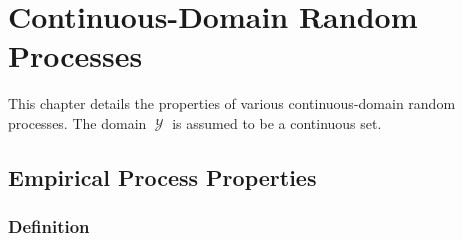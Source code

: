 \documentclass[12pt]{report}
\DeclareMathOperator{\Prm}{\mathrm{P}}
\DeclareMathOperator{\Ycal}{\mathcal{Y}}
\DeclareMathOperator{\Zcal}{\mathcal{Z}}
\DeclareMathOperator{\Mcal}{\mathcal{M}}
\DeclareMathOperator{\Scal}{\mathcal{S}}
\DeclareMathOperator{\Zbbgeq}{\mathbb{Z}_{\geq 0}}
\DeclareMathOperator{\DM}{\mathrm{DM}}
\DeclareMathOperator{\psim}{\psi_\text{m}}
\DeclareMathOperator{\uppsim}{\uppsi_\text{m}}
\DeclareMathOperator{\alpham}{\alpha_\text{m}}
\begin{document}







\chapter{Continuous-Domain Random Processes}

This chapter details the properties of various continuous-domain random processes. The domain $\Ycal$ is assumed to be a continuous set.


\section{Empirical Process Properties} \label{app:EP}


\subsection{Definition}
\end{document}
